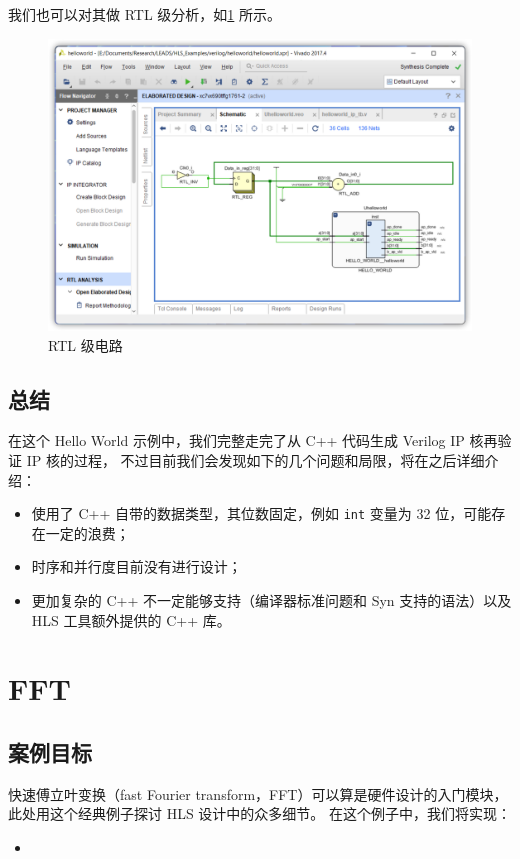 \documentclass[Chinese,TC,use boldface,simple name]{beaulivre}
\begin{document}
      我们也可以对其做 RTL 级分析，如\cref{fig:RTL_result} 所示。
      \begin{figure}[htbp]
        \centering
        \includegraphics[width=.8\linewidth]{win/helloworld/RTL_result.png}
        \caption{RTL 级电路}
        \label{fig:RTL_result}
      \end{figure}

  \section{总结}

    在这个 Hello World 示例中，我们完整走完了从 C++ 代码生成 Verilog IP 核再验证 IP 核的过程，
    不过目前我们会发现如下的几个问题和局限，将在之后详细介绍：
    \begin{itemize}
      \item 使用了 C++ 自带的数据类型，其位数固定，例如 \texttt{int} 变量为 32 位，可能存在一定的浪费；
      \item 时序和并行度目前没有进行设计；
      \item 更加复杂的 C++ 不一定能够支持（编译器标准问题和 Syn 支持的语法）以及 HLS 工具额外提供的 C++ 库。
    \end{itemize}

\chapter{FFT}

  \section{案例目标}

    快速傅立叶变换（fast Fourier transform，FFT）可以算是硬件设计的入门模块，
    此处用这个经典例子探讨 HLS 设计中的众多细节。
    在这个例子中，我们将实现：
    \begin{itemize}
      \item {}
    \end{itemize}
\end{document}
